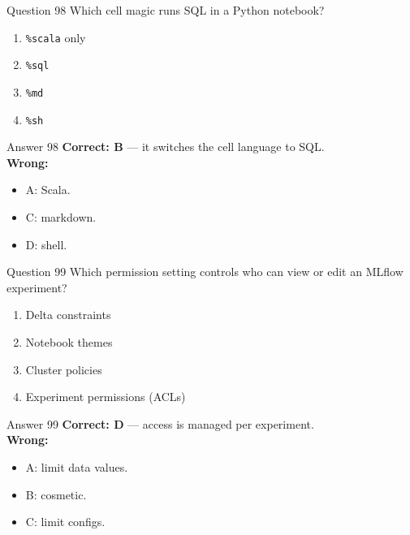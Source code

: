 \documentclass[aspectratio=169,11pt]{beamer}
\begin{document}
\begin{frame}{Question 98}
Which cell magic runs SQL in a Python notebook?
\begin{enumerate}[label=\Alph*.]
\item \texttt{\%scala} only
\item \texttt{\%sql}
\item \texttt{\%md}
\item \texttt{\%sh}
\end{enumerate}
\end{frame}
\begin{frame}{Answer 98}
\textbf{Correct: B} --- it switches the cell language to SQL.\\
\vspace{0.5em}
\textbf{Wrong:}
\begin{itemize}
\item A: Scala.
\item C: markdown.
\item D: shell.
\end{itemize}
\end{frame}

\begin{frame}{Question 99}
Which permission setting controls who can view or edit an MLflow experiment?
\begin{enumerate}[label=\Alph*.]
\item Delta constraints
\item Notebook themes
\item Cluster policies
\item Experiment permissions (ACLs)
\end{enumerate}
\end{frame}
\begin{frame}{Answer 99}
\textbf{Correct: D} --- access is managed per experiment.\\
\vspace{0.5em}
\textbf{Wrong:}
\begin{itemize}
\item A: limit data values.
\item B: cosmetic.
\item C: limit configs.
\end{itemize}
\end{frame}
\end{document}
